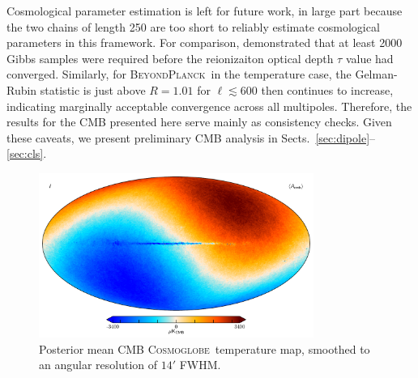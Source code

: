 \documentclass[twocolumn]{../../common/aa}
\newcommand{\bp}{\textsc{BeyondPlanck}}
\newcommand{\cosmoglobe}{\textsc{Cosmoglobe}}
\begin{document}
Cosmological parameter estimation is left for future work, in large part because the two chains of length 250 are too short to reliably estimate cosmological parameters in this framework. For comparison, \citet{bp12} demonstrated that at least 2000 Gibbs samples were required before the reionizaiton optical depth $\tau$ value had converged. Similarly, for \bp\ in the temperature case, the Gelman-Rubin statistic is just above $R=1.01$ for $\ell\lesssim600$ then continues to increase, indicating marginally acceptable convergence across all multipoles. Therefore, the results for the CMB presented here serve mainly as consistency checks. Given these caveats, we present preliminary CMB analysis in Sects.~\ref{sec:dipole}--\ref{sec:cls}.





\begin{figure}
	\centering
	\includegraphics[width=0.8\textwidth]{figures/cmb_I_dipole.pdf}
	\caption{Posterior mean CMB \cosmoglobe\ temperature map, smoothed to an angular resolution of $14'$ FWHM.}
\end{figure}
\end{document}
